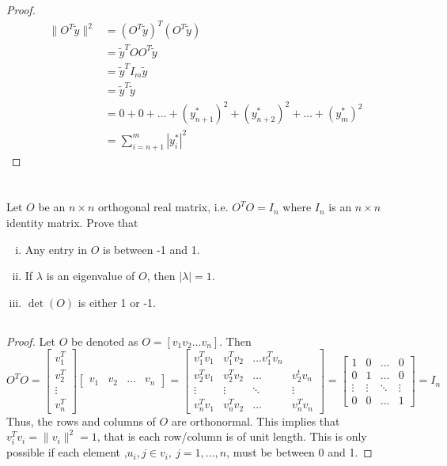 \documentclass[12pt]{article}
\begin{document}
\begin{proof}
		\begin{align*}	
			\| O^T \tilde{y} \|^2 &= (O^T\tilde{y})^T(O^T\tilde{y}) \\
			&= \tilde{y}^T O O^T \tilde{y} \\
			&= \tilde{y}^T I_m \tilde{y} \\
			&= \tilde{y}^T\tilde{y} \\ 
			&= 0+0+\dots + (y_{n+1}^*)^2 + (y_{n+2}^*)^2 + \dots +  (y_{m}^*)^2\\
			&= \sum_{i=n+1}^{m}\left|y_{i}^{*}\right|^{2} 
			\end{align*}
		\end{proof}
			
		\section{}
		Let $ O $ be an $ n \times n $ orthogonal real matrix, i.e. $ O^T O=I_n $ where $ I_n $ is an $ n \times n $ identity matrix. Prove that
		\begin{enumerate}[i)]
			\item Any entry in $ O $ is between -1 and 1.
			\item If $ \lambda $ is an eigenvalue of $ O $, then $ |\lambda|=1. $
			\item $ \det(O) $ is either 1 or -1.
		\end{enumerate}
	\subsection{}
		\begin{proof}
			Let $ O $ be denoted as $ O=[v_1 v_2 \dots v_n] $. Then \[ O^T O = \begin{bmatrix}
			v_1^T \\ v_2^T \\ \vdots \\ v_n^T
			\end{bmatrix} \begin{bmatrix}
			v_1 & v_2 & \dots & v_n
			\end{bmatrix} =\begin{bmatrix}
			v_1^Tv_1 & v_1^Tv_2 & \dots v_1^Tv_n \\
			v_2^Tv_1 & v_2^Tv_2 & \dots & v_2^tv_n \\
			\vdots & \vdots & \ddots & \vdots \\ 
			v_n^Tv_1 & v_n^Tv_2 & \dots & v_n^Tv_n
			\end{bmatrix} =\begin{bmatrix}
			1 & 0 & \dots & 0 \\
			0 & 1 & \dots & 0 \\
			\vdots & \vdots & \ddots & \vdots \\
			0 & 0 & \dots &1
			\end{bmatrix}  = I_n \] 
			Thus, the rows and columns of $ O $ are orthonormal. This implies that $ v_i^Tv_i=\| v_i \|^2 = 1 $, that is each row/column is of unit length. This is only possible if each element ,$ u_i,j\in v_i,\ j=1,\dots, n $, must be between 0 and 1.
			
		\end{proof}
\end{document}
